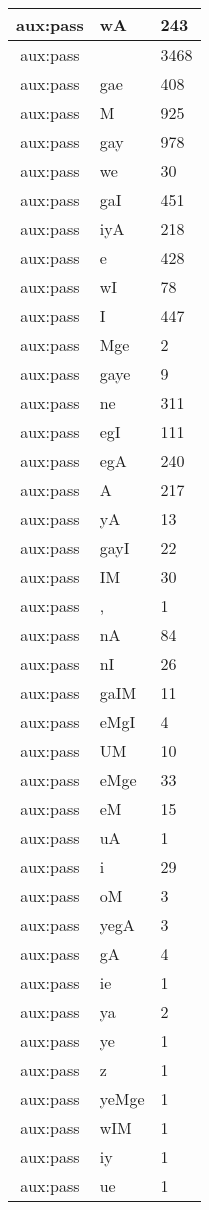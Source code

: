 \documentclass[a4 paper]{article}
\begin{document}
\begin{longtable}{cp{}p{}}
aux:pass & wA & 243\\ \midrule aux:pass &  & 3468\\ \midrule aux:pass & gae & 408\\ \midrule aux:pass & M & 925\\ \midrule aux:pass & gay & 978\\ \midrule aux:pass & we & 30\\ \midrule aux:pass & gaI & 451\\ \midrule aux:pass & iyA & 218\\ \midrule aux:pass & e & 428\\ \midrule aux:pass & wI & 78\\ \midrule aux:pass & I & 447\\ \midrule aux:pass & Mge & 2\\ \midrule aux:pass & gaye & 9\\ \midrule aux:pass & ne & 311\\ \midrule aux:pass & egI & 111\\ \midrule aux:pass & egA & 240\\ \midrule aux:pass & A & 217\\ \midrule aux:pass & yA & 13\\ \midrule aux:pass & gayI & 22\\ \midrule aux:pass & IM & 30\\ \midrule aux:pass & , & 1\\ \midrule aux:pass & nA & 84\\ \midrule aux:pass & nI & 26\\ \midrule aux:pass & gaIM & 11\\ \midrule aux:pass & eMgI & 4\\ \midrule aux:pass & UM & 10\\ \midrule aux:pass & eMge & 33\\ \midrule aux:pass & eM & 15\\ \midrule aux:pass & uA & 1\\ \midrule aux:pass & i & 29\\ \midrule aux:pass & oM & 3\\ \midrule aux:pass & yegA & 3\\ \midrule aux:pass & gA & 4\\ \midrule aux:pass & ie & 1\\ \midrule aux:pass & ya & 2\\ \midrule aux:pass & ye & 1\\ \midrule aux:pass & z & 1\\ \midrule aux:pass & yeMge & 1\\ \midrule aux:pass & wIM & 1\\ \midrule aux:pass & iy & 1\\ \midrule aux:pass & ue & 1\\ \midrule 

\end{longtable}
\end{document}

